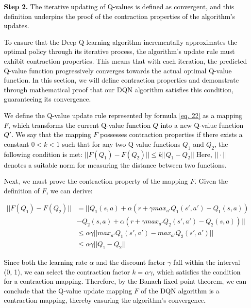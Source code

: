 \documentclass[preprint,12pt]{elsarticle}
\begin{document}
\textcolor{black}{\textbf{Step 2.}  The iterative updating of Q-values is defined as convergent, and this definition underpins the proof of the contraction properties of the algorithm's updates.}

\textcolor{black}{To ensure that the Deep Q-learning algorithm incrementally approximates the optimal policy through its iterative process, the algorithm's update rule must exhibit contraction properties. This means that with each iteration, the predicted Q-value function progressively converges towards the actual optimal Q-value function. In this section, we will define contraction properties and demonstrate through mathematical proof that our DQN algorithm satisfies this condition, guaranteeing its convergence.}

\textcolor{black}{We define the Q-value update rule represented by formula \ref{eq. 22} as a mapping \(F\), which transforms the current Q-value function \(Q\) into a new Q-value function \(Q'\). We say that the mapping \(F\) possesses contraction properties if there exists a constant \(0 < k < 1\) such that for any two Q-value functions \(Q_1\) and \(Q_2\), the following condition is met:
\(
||F(Q_1) - F(Q_2)|| \leq k ||Q_1 - Q_2||
\)
Here, \(||\cdot||\) denotes a suitable norm for measuring the distance between two functions.
}

\textcolor{black}{Next, we must prove the contraction property of the mapping \(F\). Given the definition of \(F\), we can derive:}

\textcolor{black}{
\begin{equation}
\begin{aligned}
    ||F(Q_1)-F(Q_2)||&=||Q_1(s,a)+\alpha(r+\gamma max_{a'}Q_1(s',a')-Q_1(s,a))\\&-Q_2(s,a)+ \alpha(r+\gamma max_{a'}Q_2(s',a')-Q_2(s,a))||\\
    &\leq\alpha\gamma ||max_{a'}Q_1(s',a')-max_{a'}Q_2(s',a')||\\
    &\leq \alpha \gamma ||Q_1-Q_2||
\end{aligned}
\end{equation}
}

\textcolor{black}{Since both the learning rate \(\alpha\) and the discount factor \(\gamma\) fall within the interval (0, 1), we can select the contraction factor \(k = \alpha \gamma\), which satisfies the condition for a contraction mapping. Therefore, by the Banach fixed-point theorem, we can conclude that the Q-value update mapping \(F\) of the DQN algorithm is a contraction mapping, thereby ensuring the algorithm's convergence.}
\end{document}
